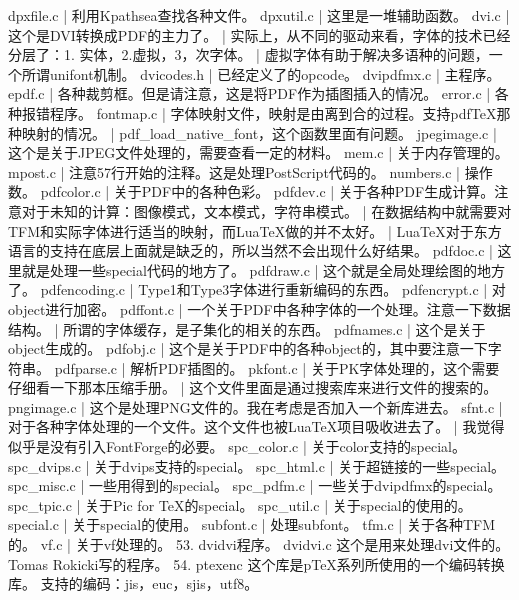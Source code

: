     dpxfile.c | 利用Kpathsea查找各种文件。
    dpxutil.c | 这里是一堆辅助函数。
    dvi.c | 这个是DVI转换成PDF的主力了。
          | 实际上，从不同的驱动来看，字体的技术已经分层了：1. 实体，2.虚拟，3，次字体。
          | 虚拟字体有助于解决多语种的问题，一个所谓unifont机制。
    dvicodes.h | 已经定义了的opcode。
    dvipdfmx.c | 主程序。
    epdf.c | 各种裁剪框。但是请注意，这是将PDF作为插图插入的情况。
    error.c | 各种报错程序。
    fontmap.c | 字体映射文件，映射是由离到合的过程。支持pdfTeX那种映射的情况。
              | pdf_load_native_font，这个函数里面有问题。
    jpegimage.c | 这个是关于JPEG文件处理的，需要查看一定的材料。
    mem.c | 关于内存管理的。
    mpost.c | 注意57行开始的注释。这是处理PostScript代码的。
    numbers.c | 操作数。
    pdfcolor.c | 关于PDF中的各种色彩。
    pdfdev.c | 关于各种PDF生成计算。注意对于未知的计算：图像模式，文本模式，字符串模式。
             | 在数据结构中就需要对TFM和实际字体进行适当的映射，而LuaTeX做的并不太好。
             | LuaTeX对于东方语言的支持在底层上面就是缺乏的，所以当然不会出现什么好结果。
    pdfdoc.c | 这里就是处理一些special代码的地方了。
    pdfdraw.c | 这个就是全局处理绘图的地方了。
    pdfencoding.c | Type1和Type3字体进行重新编码的东西。
    pdfencrypt.c | 对object进行加密。
    pdffont.c | 一个关于PDF中各种字体的一个处理。注意一下数据结构。
              | 所谓的字体缓存，是子集化的相关的东西。
    pdfnames.c | 这个是关于object生成的。
    pdfobj.c | 这个是关于PDF中的各种object的，其中要注意一下字符串。
    pdfparse.c | 解析PDF插图的。
    pkfont.c | 关于PK字体处理的，这个需要仔细看一下那本压缩手册。
             | 这个文件里面是通过搜索库来进行文件的搜索的。
    pngimage.c | 这个是处理PNG文件的。我在考虑是否加入一个新库进去。
    sfnt.c | 对于各种字体处理的一个文件。这个文件也被LuaTeX项目吸收进去了。
           | 我觉得似乎是没有引入FontForge的必要。
    spc_color.c | 关于color支持的special。
    spc_dvips.c | 关于dvips支持的special。
    spc_html.c | 关于超链接的一些special。
    spc_misc.c | 一些用得到的special。
    spc_pdfm.c | 一些关于dvipdfmx的special。
    spc_tpic.c | 关于Pic for TeX的special。
    spc_util.c | 关于special的使用的。
    special.c | 关于special的使用。
    subfont.c | 处理subfont。
    tfm.c | 关于各种TFM的。
    vf.c | 关于vf处理的。
53. dvidvi程序。
    dvidvi.c 这个是用来处理dvi文件的。Tomas Rokicki写的程序。
54. ptexenc
    这个库是pTeX系列所使用的一个编码转换库。
    支持的编码：jis，euc，sjis，utf8。
